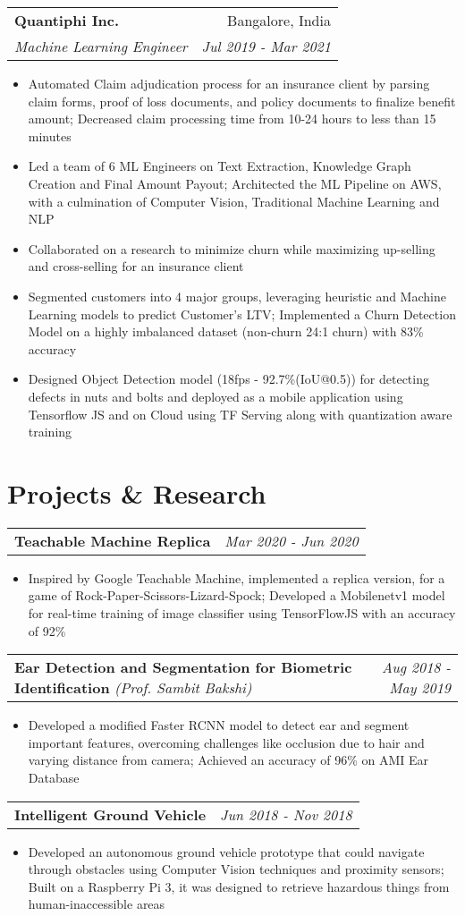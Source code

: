 \documentclass[letterpaper,10.8pt]{article}
\makeatletter
\newcommand{\resumeItem}[2]{
  \item\small{
    \textbf{#1}{#2 \vspace{-6pt}}
  }
}
\newcommand{\resumeSubheading}[4]{
  \vspace{-1pt}\item
  \hspace{5pt}
    \begin{tabular*}{0.97\textwidth}{l@{\extracolsep{\fill}}r}
      \textbf{#1} & #2 \\
      \textit{\small#3} & \textit{\small #4} \\
    \end{tabular*}\vspace{-5pt}
}
\newcommand{\resumeSubheadingProjects}[2]{
  \vspace{-1pt}\item
  \hspace{5pt}
    \begin{tabular*}{0.97\textwidth}{l@{\extracolsep{\fill}}r}
      #1 & \textit{\small #2} \\
    \end{tabular*}\vspace{-5pt}
}
\newcommand{\resumeItemListStart}{\begin{itemize}}
\newcommand{\resumeItemListEnd}{\end{itemize}\vspace{1pt}}
\makeatother
\begin{document}
      \resumeSubheading{Quantiphi Inc.}{Bangalore, India}{Machine Learning Engineer}{Jul 2019 - Mar 2021}
      \resumeItemListStart
      \resumeItem{}{Automated Claim adjudication process for an insurance client by parsing claim forms, proof of loss documents, and policy documents to finalize benefit amount; Decreased claim processing time from 10-24 hours to less than 15 minutes}
      \resumeItem{}{Led a team of 6 ML Engineers on Text Extraction, Knowledge Graph Creation and Final Amount Payout; Architected the ML Pipeline on AWS, with a culmination of Computer Vision, Traditional Machine Learning and NLP}
      \resumeItem{}{Collaborated on a research to minimize churn while maximizing up-selling and cross-selling for an insurance client}
      \resumeItem{}{Segmented customers into 4 major groups, leveraging heuristic and Machine Learning models to predict Customer's LTV; Implemented a Churn Detection Model on a highly imbalanced dataset (non-churn 24:1 churn) with 83\% accuracy}
      \resumeItem{}{Designed Object Detection model (18fps - 92.7\%(IoU@0.5)) for detecting defects in nuts and bolts and deployed as a mobile application using Tensorflow JS and on Cloud using TF Serving along with quantization aware training}
      \resumeItemListEnd

\section{Projects \& Research}

    \resumeSubheadingProjects{\textbf{Teachable Machine Replica}}{Mar 2020 - Jun 2020}
      
      \resumeItemListStart
      \resumeItem{}{Inspired by Google Teachable Machine, implemented a replica version, for a game of Rock-Paper-Scissors-Lizard-Spock; Developed a Mobilenetv1 model for real-time training of image classifier using TensorFlowJS with an accuracy of 92\%}
      \resumeItemListEnd
      
    \resumeSubheadingProjects{\textbf{Ear Detection and Segmentation for Biometric Identification }{\small\textit{(Prof. Sambit Bakshi)}}}{Aug 2018 - May 2019}
      \resumeItemListStart
      \resumeItem{}{Developed a modified Faster RCNN model to detect ear and segment important features, overcoming challenges like occlusion due to hair and varying distance from camera; Achieved an accuracy of 96\% on AMI Ear Database}
      \resumeItemListEnd
      
    \resumeSubheadingProjects{\textbf{Intelligent Ground Vehicle}}{Jun 2018 - Nov 2018}
    \resumeItemListStart
    \resumeItem{}{Developed an autonomous ground vehicle prototype that could navigate through obstacles using Computer Vision techniques and proximity sensors; Built on a Raspberry Pi 3, it was designed to retrieve hazardous things from human-inaccessible areas}
    \resumeItemListEnd
\end{document}
